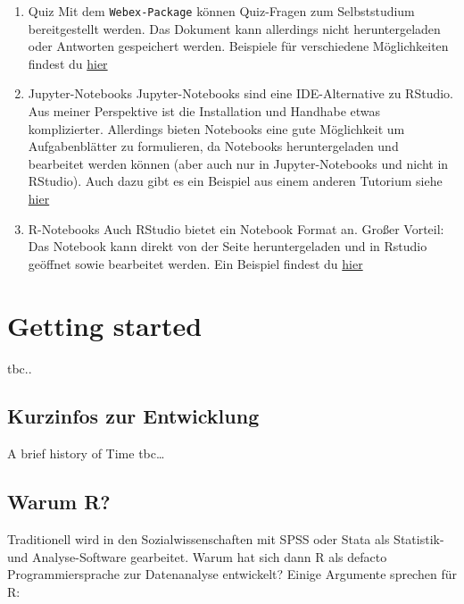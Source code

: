 \documentclass[
]{book}
\begin{document}
\begin{enumerate}
\def\labelenumi{\arabic{enumi}.}
\item
  Quiz
  Mit dem \texttt{Webex-Package} können Quiz-Fragen zum Selbststudium bereitgestellt werden. Das Dokument kann allerdings nicht heruntergeladen oder Antworten gespeichert werden. Beispiele für verschiedene Möglichkeiten findest du \href{https://marcohhu.github.io/data_kurs.github.io/notebooks/sandbox_quiz.html}{hier}
\item
  Jupyter-Notebooks
  Jupyter-Notebooks sind eine IDE-Alternative zu RStudio. Aus meiner Perspektive ist die Installation und Handhabe etwas komplizierter. Allerdings bieten Notebooks eine gute Möglichkeit um Aufgabenblätter zu formulieren, da Notebooks heruntergeladen und bearbeitet werden können (aber auch nur in Jupyter-Notebooks und nicht in RStudio). Auch dazu gibt es ein Beispiel aus einem anderen Tutorium siehe \href{https://marcohhu.github.io/data_kurs.github.io/notebooks/vis.html}{hier}
\item
  R-Notebooks
  Auch RStudio bietet ein Notebook Format an. Großer Vorteil: Das Notebook kann direkt von der Seite heruntergeladen und in Rstudio geöffnet sowie bearbeitet werden. Ein Beispiel findest du \href{https://marcohhu.github.io/data_kurs.github.io/notebooks/sandbox.nb.html.html}{hier}
\end{enumerate}

\hypertarget{start}{%
\chapter{Getting started}\label{start}}

tbc..

\hypertarget{kurzinfos-zur-entwicklung}{%
\section{Kurzinfos zur Entwicklung}\label{kurzinfos-zur-entwicklung}}

A brief history of Time tbc\ldots{}

\hypertarget{warum-r}{%
\section{Warum R?}\label{warum-r}}

Traditionell wird in den Sozialwissenschaften mit SPSS oder Stata als Statistik- und Analyse-Software gearbeitet. Warum hat sich dann R als defacto Programmiersprache zur Datenanalyse entwickelt? Einige Argumente sprechen für R:
\end{document}
